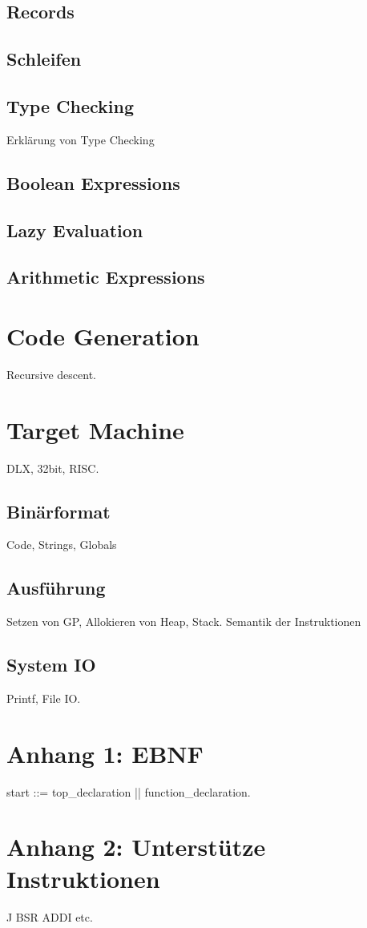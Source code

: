 \documentclass{article}
\begin{document}
	\subsection{Records}

	\subsection{Schleifen}

	\subsection{Type Checking}
	Erklärung von Type Checking

	\subsection{Boolean Expressions}

	\subsection{Lazy Evaluation}

	\subsection{Arithmetic Expressions}

	\section{Code Generation}
	Recursive descent.

	\section{Target Machine}
	DLX, 32bit, RISC.

	\subsection{Binärformat}
	Code, Strings, Globals

	\subsection{Ausführung}
	Setzen von GP, Allokieren von Heap, Stack. Semantik der Instruktionen

	\subsection{System IO}
	Printf, File IO.

	\newpage
	\section{Anhang 1: EBNF}
	start ::= top\_declaration || function\_declaration.

	\newpage
	\section{Anhang 2: Unterstütze Instruktionen}
	J
	BSR
	ADDI
	etc.
\end{document}
